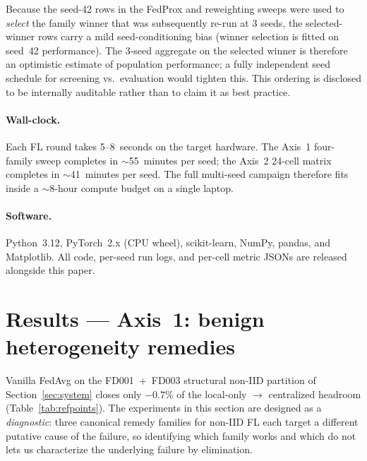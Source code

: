 \documentclass[preprint,12pt,authoryear]{elsarticle}
\begin{document}
Because the seed-42 rows in the FedProx and reweighting sweeps were
used to \emph{select} the family winner that was subsequently
re-run at 3 seeds, the selected-winner rows carry a mild
seed-conditioning bias (winner selection is fitted on seed~42
performance). The 3-seed aggregate on the selected winner is
therefore an optimistic estimate of population performance; a fully
independent seed schedule for screening vs.\ evaluation would
tighten this. This ordering is disclosed to be internally auditable
rather than to claim it as best practice.

\paragraph{Wall-clock.}
Each FL round takes 5--8~seconds on the target hardware. The
Axis~1 four-family sweep completes in $\sim$55~minutes per seed;
the Axis~2 24-cell matrix completes in $\sim$41~minutes per seed.
The full multi-seed campaign therefore fits inside a $\sim$8-hour
compute budget on a single laptop.

\paragraph{Software.}
Python~3.12, PyTorch~2.x (CPU wheel), scikit-learn, NumPy, pandas,
and Matplotlib. All code, per-seed run logs, and per-cell metric
JSONs are released alongside this paper.



\section{Results --- Axis~1: benign heterogeneity remedies}
\label{sec:axis1-results}

Vanilla FedAvg on the FD001~$+$~FD003 structural non-IID partition of
Section~\ref{sec:system} closes only $-0.7\%$ of the local-only
$\to$ centralized headroom (Table~\ref{tab:refpoints}). The experiments in
this section are designed as a \emph{diagnostic}: three canonical remedy
families for non-IID FL each target a different putative cause of the
failure, so identifying which family works and which do not lets us
characterize the underlying failure by elimination.
\end{document}
